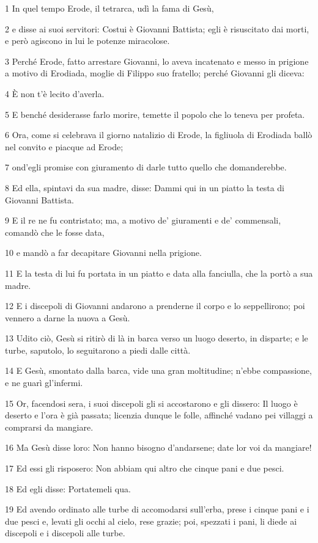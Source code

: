 \par 1 In quel tempo Erode, il tetrarca, udì la fama di Gesù,
\par 2 e disse ai suoi servitori: Costui è Giovanni Battista; egli è risuscitato dai morti, e però agiscono in lui le potenze miracolose.
\par 3 Perché Erode, fatto arrestare Giovanni, lo aveva incatenato e messo in prigione a motivo di Erodiada, moglie di Filippo suo fratello; perché Giovanni gli diceva:
\par 4 È non t'è lecito d'averla.
\par 5 E benché desiderasse farlo morire, temette il popolo che lo teneva per profeta.
\par 6 Ora, come si celebrava il giorno natalizio di Erode, la figliuola di Erodiada ballò nel convito e piacque ad Erode;
\par 7 ond'egli promise con giuramento di darle tutto quello che domanderebbe.
\par 8 Ed ella, spintavi da sua madre, disse: Dammi qui in un piatto la testa di Giovanni Battista.
\par 9 E il re ne fu contristato; ma, a motivo de' giuramenti e de' commensali, comandò che le fosse data,
\par 10 e mandò a far decapitare Giovanni nella prigione.
\par 11 E la testa di lui fu portata in un piatto e data alla fanciulla, che la portò a sua madre.
\par 12 E i discepoli di Giovanni andarono a prenderne il corpo e lo seppellirono; poi vennero a darne la nuova a Gesù.
\par 13 Udito ciò, Gesù si ritirò di là in barca verso un luogo deserto, in disparte; e le turbe, saputolo, lo seguitarono a piedi dalle città.
\par 14 E Gesù, smontato dalla barca, vide una gran moltitudine; n'ebbe compassione, e ne guarì gl'infermi.
\par 15 Or, facendosi sera, i suoi discepoli gli si accostarono e gli dissero: Il luogo è deserto e l'ora è già passata; licenzia dunque le folle, affinché vadano pei villaggi a comprarsi da mangiare.
\par 16 Ma Gesù disse loro: Non hanno bisogno d'andarsene; date lor voi da mangiare!
\par 17 Ed essi gli risposero: Non abbiam qui altro che cinque pani e due pesci.
\par 18 Ed egli disse: Portatemeli qua.
\par 19 Ed avendo ordinato alle turbe di accomodarsi sull'erba, prese i cinque pani e i due pesci e, levati gli occhi al cielo, rese grazie; poi, spezzati i pani, li diede ai discepoli e i discepoli alle turbe.
